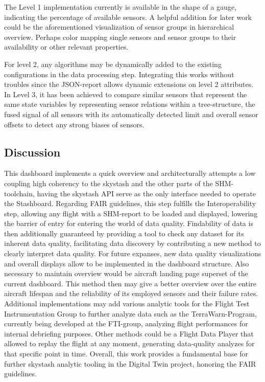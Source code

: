 The Level 1 implementation currently is available in the shape of a gauge, indicating the percentage of available sensors. A helpful addition for later work could be the aforementioned visualization of sensor groups in hierarchical overview. Perhaps color mapping single sensors and sensor groups to their availability or other relevant properties.

For level 2, any algorithms may be dynamically added to the existing configurations in the data processing step. Integrating this works without troubles since the JSON-report allows dynamic extensions on level 2 attributes.
In Level 3, it has been achieved to compare similar sensors that represent the same state variables by representing sensor relations within a tree-structure, the fused signal of all sensors with its automatically detected limit and overall sensor offsets to detect any strong biases of sensors.

\subsection{Discussion}

This dashboard implements a quick overview and architecturally attempts a low coupling high coherency to the skystash and the other parts of the SHM-toolchain, having the skystash API serve as the only interface needed to operate the Stashboard.
Regarding FAIR guidelines, this step fulfills the Interoperability step, allowing any flight with a SHM-report to be loaded and displayed, lowering the barrier of entry for entering the world of data quality. Findability of data is then additionally guaranteed by providing a tool to check any dataset for its inherent data quality, facilitating data discovery by contributing a new method to clearly interpret data quality.
For future expanses, new data quality visualizations and overall displays allow to be implemented in the dashboard structure. Also necessary to maintain overview would be aircraft landing page superset of the current dashboard. This method then may give a better overview over the entire aircraft lifespan and the reliability of its employed sensors and their failure rates. Additional implementations may add various analytic tools for the Flight Test Instrumentation Group to further analyze data such as the TerraWarn-Program, currently being developed at the FTI-group, analyzing flight performances for internal debriefing purposes. Other methods could be a Flight Data Player that allowed to replay the flight at any moment, generating data-quality analyzes for that specific point in time. Overall, this work provides a fundamental base for further skystash analytic tooling in the Digital Twin project, honoring the FAIR guidelines.


